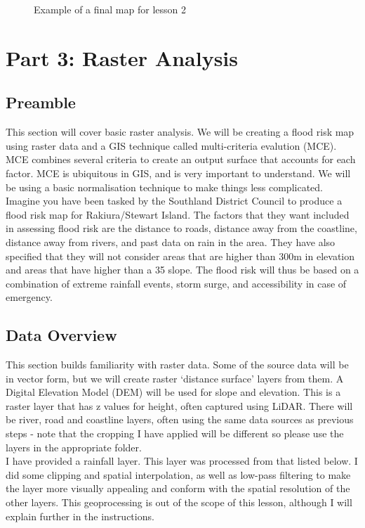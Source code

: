 \documentclass{article}
\begin{document}
\begin{figure}[h]
  \centering
  \caption{Example of a final map for lesson 2}
  \label{2_map}
\end{figure}

\pagebreak
\section{Part 3: Raster Analysis}
\subsection{Preamble}
This section will cover basic raster analysis. We will be creating a flood risk map using raster data and a GIS technique called multi-criteria evalution (MCE). MCE combines several criteria to create an output surface that accounts for each factor. MCE is ubiquitous in GIS, and is very important to understand. We will be using a basic normalisation technique to make things less complicated.\\

Imagine you have been tasked by the Southland District Council to produce a flood risk map for Rakiura/Stewart Island. The factors that they want included in assessing flood risk are the distance to roads, distance away from the coastline, distance away from rivers, and past data on rain in the area. They have also specified that they will not consider areas that are higher than 300m in elevation and areas that have higher than a 35\textdegree{} slope. The flood risk will thus be based on a combination of extreme rainfall events, storm surge, and accessibility in case of emergency.

\subsection{Data Overview}
This section builds familiarity with raster data. Some of the source data will be in vector form, but we will create raster `distance surface' layers from them. A Digital Elevation Model (DEM) will be used for slope and elevation. This is a raster layer that has z values for height, often captured using LiDAR. There will be river, road and coastline layers, often using the same data sources as previous steps - note that the cropping I have applied will be different so please use the layers in the appropriate folder. \\

I have provided a rainfall layer. This layer was processed from that listed below. I did some clipping and spatial interpolation, as well as low-pass filtering to make the layer more visually appealing and conform with the spatial resolution of the other layers. This geoprocessing is out of the scope of this lesson, although I will explain further in the instructions.
\end{document}
